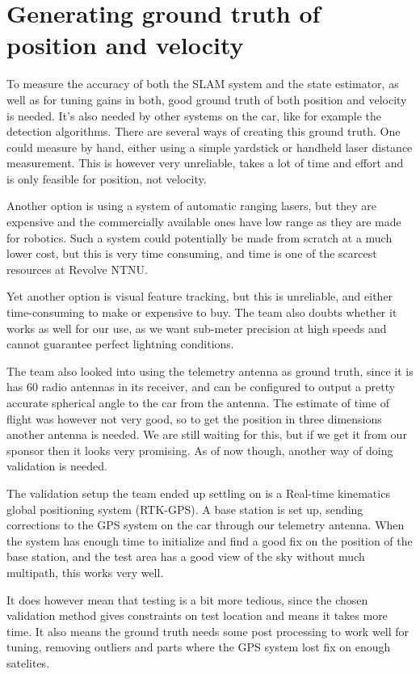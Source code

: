 \section{Generating ground truth of position and velocity}

To measure the accuracy of both the SLAM system and the state estimator, as well as for tuning gains in both, good ground truth of both position and velocity is needed. It's also needed by other systems on the car, like for example the detection algorithms. There are several ways of creating this ground truth. One could measure by hand, either using a simple yardstick or handheld laser distance measurement. This is however very unreliable, takes a lot of time and effort and is only feasible for position, not velocity.

Another option is using a system of automatic ranging lasers, but they are expensive and the commercially available ones have low range as they are made for robotics. Such a system could potentially be made from scratch at a much lower cost, but this is very time consuming, and time is one of the scarcest resources at Revolve NTNU. 

Yet another option is visual feature tracking, but this is unreliable, and either time-consuming to make or expensive to buy. The team also doubts whether it works as well for our use, as we want sub-meter precision at high speeds and cannot guarantee perfect lightning conditions. 

The team also looked into using the telemetry antenna as ground truth, since it is has $60$ radio antennas in its receiver, and can be configured to output a pretty accurate spherical angle to the car from the antenna. The estimate of time of flight was however not very good, so to get the position in three dimensions another antenna is needed. We are still waiting for this, but if we get it from our sponsor then it looks very promising. As of now though, another way of doing validation is needed. 

The validation setup the team ended up settling on is a Real-time kinematics global positioning system (RTK-GPS). A base station is set up, sending corrections to the GPS system on the car through our telemetry antenna. When the system has enough time to initialize and find a good fix on the position of the base station, and the test area has a good view of the sky without much multipath, this works very well. 

It does however mean that testing is a bit more tedious, since the chosen validation method gives constraints on test location and means it takes more time. It also means the ground truth needs some post processing to work well for tuning, removing outliers and parts where the GPS system lost fix on enough satelites.